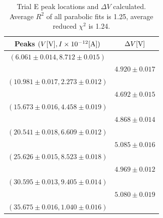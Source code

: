 \documentclass[12pt]{article}
\begin{document}
\begin{table}[h!]
    \centering
    \caption{\centering Trial E peak locations and $\Delta V$ calculated. Average $R^2$ of all parabolic fits is 1.25, average reduced $\chi^2$ is 1.24.}   
    \begin{tabular}{cc}
        \toprule
        Peaks $(V [{\rm V}], I \times10^{-12}[{\rm A}])$ & $\Delta V{\rm [V]}$ \\
        \midrule
        $(6.061 \pm 0.014, 8.712 \pm 0.015)$ & \\
        & $4.920 \pm 0.017$ \\
        $(10.981 \pm 0.017, 2.273 \pm 0.012)$ & \\
        & $4.692 \pm 0.015$ \\
        $(15.673 \pm 0.016, 4.458 \pm 0.019)$ & \\
        & $4.868 \pm 0.014$ \\
        $(20.541 \pm 0.018, 6.609 \pm 0.012)$ & \\
        & $5.085 \pm 0.016$ \\
        $(25.626 \pm 0.015, 8.523 \pm 0.018)$ & \\
        & $4.969 \pm 0.012$ \\
        $(30.595 \pm 0.013, 9.405 \pm 0.014)$ & \\
        & $5.080 \pm 0.019$ \\
        $(35.675 \pm 0.016, 1.040 \pm 0.016)$ & \\
        \bottomrule
    \end{tabular}
    \label{table:E_peaks}
\end{table}
\end{document}
